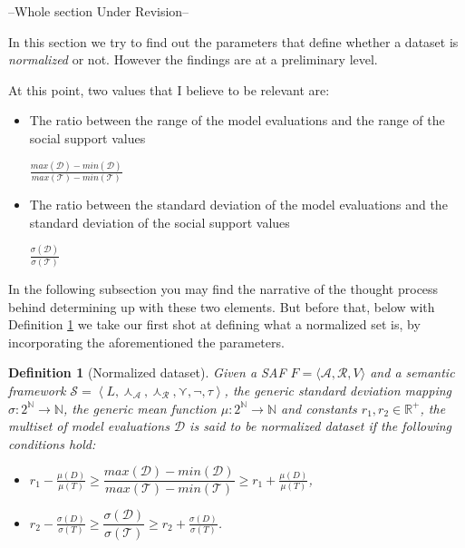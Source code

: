 \documentclass{article}
\newtheorem{definition}{Definition}
\newtheorem{example}{Example}
\newcommand{\nat}{\mathbb{N}}   %
\newcommand{\real}{\mathbb{R}}  %
\newcommand{\args}{\mathcal{A}} %
\newcommand{\att}{\mathcal{R}}  %
\newcommand{\valueset}{L}
\newcommand{\safid}{F}               %
\newcommand{\saf}{\safid = \safbody} %
\newcommand{\safbody}{\langle \args, \att, V \rangle} %
\newcommand{\sembodyNew}{\left\langle \valueset,\SAFand_\mathcal{A}, \SAFand_\mathcal{R},\SAFor,\lnot,\tau \right\rangle} %
\newcommand{\SAFand}{\curlywedge}     %
\newcommand{\SAFor}{\curlyvee}        %
\newcommand{\sem}{\mathcal{S}}
\newcommand{\dataset}{\mathcal{D}}   %
\newcommand{\ssset}{\mathcal{T}}   %
\begin{document}
--Whole section Under Revision--

In this section we try to find out the parameters that define whether a dataset is \textit{normalized} or not. However the findings are at a preliminary level.

At this point, two values that I believe to be relevant are:
\begin{itemize}
\item The ratio between the range of the model evaluations and the range of the social support values

\begin{center}
 $\frac{max(\dataset) - min(\dataset)}{max(\ssset) - min(\ssset)}$
\end{center}
\item The ratio between the standard deviation of the model evaluations and the standard deviation of the social support values

\begin{center}
$\frac{\sigma(\dataset)}{\sigma(\ssset)}$
\end{center}
\end{itemize}

In the following subsection you may find the narrative of the thought process behind determining up with these two elements. But before that, below with Definition \ref{def:normSet} we take our first shot at defining what a normalized set is, by incorporating the aforementioned the parameters.


\begin{definition} [Normalized dataset]
\label{def:normSet}  
Given a SAF $\saf$ and a semantic framework $\sem = \sembodyNew$, the generic standard deviation mapping $\sigma: 2^{\nat} \rightarrow \nat$, the generic mean function $\mu: 2^{\nat} \rightarrow \nat$  and constants $r_1,  r_2 \in \real^+$, the multiset of model evaluations $\dataset$ is said to be normalized dataset if the following conditions hold:
\begin{itemize}
\item $r_1 - \frac{\mu(D)}{\mu(T)} \geq \dfrac{max(\dataset) - min(\dataset)}{max(\ssset) - min(\ssset)} \geq r_1 + \frac{\mu(D)}{\mu(T)}$, 
\item   $r_2 - \frac{\sigma(D)}{\sigma(T)} \geq \dfrac{\sigma(\dataset)}{\sigma(\ssset)} \geq r_2 + \frac{\sigma(D)}{\sigma(T)}$.
\end{itemize}
\end{definition}

\begin{comment}
\begin{example}
Let $\saf$ be a SAF, $\sem = \sembodyNew$ a semantic framework, $\args =\{a_1, a_2, a_3\}$ and $\att =\{\}.$
\end{example}
\end{comment}
\end{document}
